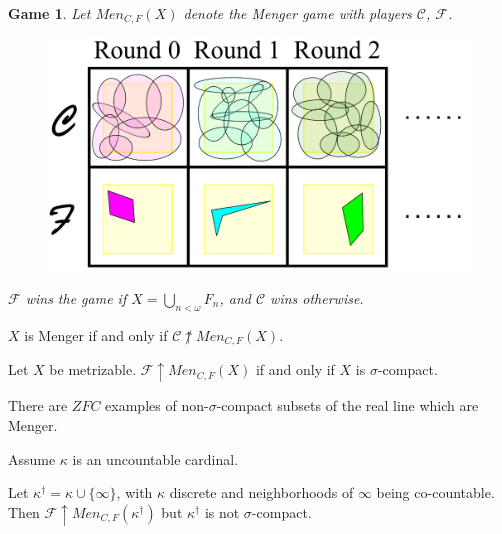 \documentclass{beamer}
\theoremstyle{example}
\newtheorem{game}[theorem]{Game}
\theoremstyle{definition}
\newcommand{\win}{\uparrow}
\newcommand{\oneptlind}[1]{#1^\dagger} %
\newcommand{\menGame}[1]{Men_{C,F}\left({#1}\right)}
\newcommand{\<}{\langle}
\renewcommand{\>}{\rangle}
\newcommand{\pl}[1]{\mathscr{#1}}
\newcommand{\term}{\textit}
\begin{document}
\begin{frame}
  \begin{game}
    Let \(\menGame{X}\) denote the \term{Menger game} with players
    \(\pl C\), \(\pl F\).

    \begin{figure}
      \includegraphics[width=0.6\linewidth]{mengerGame.pdf}
    \end{figure}

    \(\pl F\) wins the game if
    \(X=\bigcup_{n<\omega} F_n\), and \(\pl C\) wins otherwise.
  \end{game}
\end{frame}

\begin{frame}

  \begin{theorem}
    \(X\) is Menger if and only if \(\pl C \not\win \menGame X\).
  \end{theorem}

  \pause

  \begin{theorem}
    Let \(X\) be metrizable. \(\pl F\win\menGame X\) if and only if \(X\) is
    \(\sigma\)-compact.
  \end{theorem}

  \pause

  \begin{theorem}
    There are \(ZFC\) examples of non-\(\sigma\)-compact
    subsets of the real line which are Menger.
  \end{theorem}

\end{frame}

\begin{frame}

  Assume \(\kappa\) is an uncountable cardinal.

  \begin{example}
    Let \(\oneptlind\kappa=\kappa\cup\{\infty\}\), with \(\kappa\)
    discrete and neighborhoods of \(\infty\) being co-countable.
    Then \(\pl F\win\menGame{\oneptlind\kappa}\) but \(\oneptlind\kappa\)
    is not \(\sigma\)-compact.
  \end{example}

\end{frame}
\end{document}
